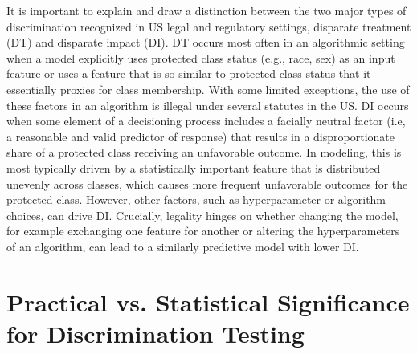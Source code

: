 \documentclass[information,article,accept,moreauthors,pdftex]{Definitions/mdpi}
\begin{document}
{It is important to explain and draw a distinction between the two major types of discrimination recognized in US legal and regulatory settings, disparate treatment (DT) and disparate impact (DI). DT occurs most often in an algorithmic setting when a model explicitly uses protected class status (e.g., race, sex) as an input feature or uses a feature that is so similar to protected class status that it essentially proxies for class membership.  With some limited exceptions, the use of these factors in an algorithm is illegal under several statutes in the US. DI occurs when some element of a decisioning process includes a {facially neutral} factor (i.e, a reasonable and valid predictor of response) that results in a disproportionate share of a protected class receiving an unfavorable outcome.  In modeling, this is most typically driven by a statistically important feature that is distributed unevenly across classes, which causes more frequent unfavorable outcomes for the protected class.  However, other factors, such as hyperparameter or algorithm choices, can drive DI.  Crucially, legality hinges on whether changing the model, for example exchanging one feature for another or altering the hyperparameters of an algorithm, can lead to a similarly predictive model with lower DI.

\section{Practical vs. Statistical Significance for Discrimination Testing}\label{a_sec:prac_v_stat}

}
\end{document}
